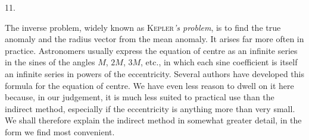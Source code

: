 \par{}
\begin{center}
11.
\end{center}
The inverse problem, widely known as \textsc{Kepler}\emph{'s problem}, is to find the true anomaly and the radius vector from the mean anomaly. It arises far more often in practice. Astronomers usually express the equation of centre as an infinite series in the sines of the angles $M$, $2M$, $3M$, etc., in which each sine coefficient is itself an infinite series in powers of the eccentricity. Several authors have developed this formula for the equation of centre. We have even less reason to dwell on it here because, in our judgement, it is much less suited to practical use than the indirect method, especially if the eccentricity is anything more than very small. We shall therefore explain the indirect method in somewhat greater detail, in the form we find most convenient.

